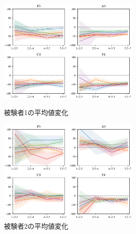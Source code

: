 \documentclass[10.5ptj,a4j,dvipdfmx,uplatex, oneside, openany, report, draft]{jsbook}%
\begin{document}
\begin{figure}[htbp]
    \begin{minipage}{0.5\hsize}
        \begin{center}
            \includegraphics[clip,width=7.0cm]{long_mean_1.png}
          \end{center}
     \caption{被験者1の平均値変化}
     \label{long_mean_1}
    \end{minipage}
    \begin{minipage}{0.5\hsize}
        \begin{center}
            \includegraphics[clip,width=7.0cm]{long_mean_2.png}
          \end{center}
     \caption{被験者2の平均値変化}
     \label{long_mean_2}
    \end{minipage}
\end{figure}
\end{document}
